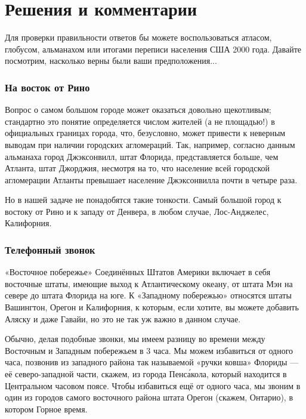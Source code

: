 \section*{Решения и комментарии}

Для проверки правильности ответов бы можете воспользоваться атласом, глобусом, альманахом или итогами переписи населения США 2000 года.
Давайте посмотрим, насколько верны были ваши предположения...

\subsubsection*{На восток от Рино}%

Вопрос о самом большом городе может оказаться довольно щекотливым; 
стандартно это понятие определяется числом жителей (а не площадью!) в официальных границах города, что, безусловно, может привести к неверным выводам
при наличии городских агломераций.
Так, например, согласно данным альманаха город Джэксонвилл, штат Флорида, представляется больше, чем Атланта, штат Джорджия, несмотря на то, что население всей городской агломерации Атланты превышает население Джэксонвилла почти в четыре раза.

\medskip

Но в нашей задаче не понадобятся такие тонкости.
Самый большой город к востоку от Рино и к западу от Денвера, в любом случае, Лос-Анджелес, Калифорния.
\heart

\subsubsection*{Телефонный звонок}%

«Восточное побережье» Соединённых Штатов Америки включает в себя восточные штаты, имеющие выход к Атлантическому океану, от штата Мэн на севере до штата Флорида на юге.
К «Западному побережью» относятся штаты Вашингтон, Орегон и Калифорния,
к которым, если хотите, вы можете добавить Аляску и даже Гавайи, но это не так уж важно в данном случае. %

Обычно, делая подобные звонки, мы имеем разницу во времени между Восточным и Западным побережьем в 3 часа.
Мы можем избавиться от одного часа, позвонив из западного района так называемой «ручки ковша» Флориды --- её северо-западной части, %
скажем, из города Пенс\'{а}кола, который находится в Центральном часовом поясе.
Чтобы избавиться ещё от одного часа, мы звоним в один из городов самого восточного района штата Орегон (скажем, Онтарио), в котором Горное время.

